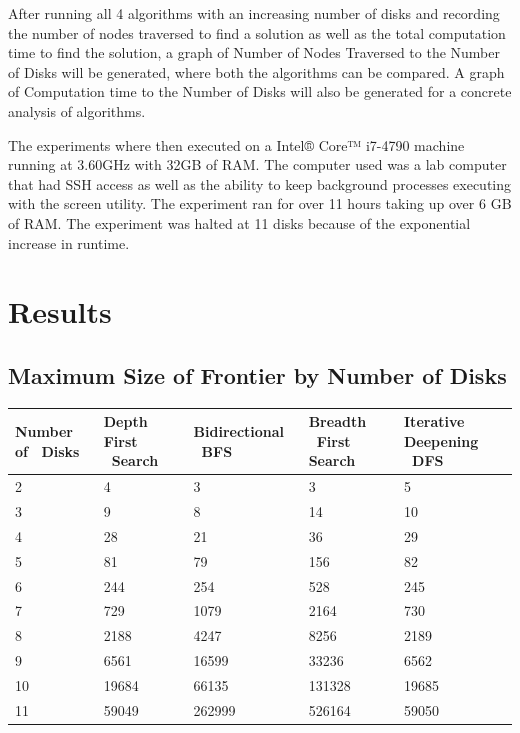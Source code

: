 \documentclass[conference]{IEEEtran}
\begin{document}
After running all 4 algorithms with an increasing number of disks and recording the number of nodes traversed to find a solution as well as the total computation time to find the solution, a graph of Number of Nodes Traversed to the Number of Disks will be generated, where both the algorithms can be compared. A graph of Computation time to the Number of Disks will also be generated for a concrete analysis of algorithms.

The experiments where then executed on a Intel® Core™ i7-4790 machine running at 3.60GHz with 32GB of RAM. The computer used was a lab computer that had SSH access as well as the ability to keep background processes executing with the screen utility. The experiment ran for over 11 hours taking up over 6 GB of RAM. The experiment was halted at 11 disks because of the exponential increase in runtime.

\section{Results}

\subsection{Maximum Size of Frontier by Number of Disks}

\begin{tabular}{ | p{0.97cm} | p{1cm} | p{2cm} | p{1cm} | p{1.2cm} |}
    \hline
    Number of \ Disks & Depth First \ Search & Bidirectional \ BFS & Breadth \ First Search & Iterative Deepening \ DFS \\ \hline
    2 & 4 & 3 & 3 & 5 \\ \hline
    3 & 9 & 8 & 14 & 10 \\ \hline
    4 & 28 & 21 & 36 & 29 \\ \hline
    5 & 81 & 79 & 156 & 82 \\ \hline
    6 & 244 & 254 & 528 & 245 \\ \hline
    7 & 729 & 1079 & 2164 & 730 \\ \hline
    8 & 2188 & 4247 & 8256 & 2189 \\ \hline
    9 & 6561 & 16599 & 33236 & 6562 \\ \hline
    10 & 19684 & 66135 & 131328 & 19685 \\ \hline
    11 & 59049 & 262999 & 526164 & 59050 \\ \hline
\end{tabular}
\end{document}
